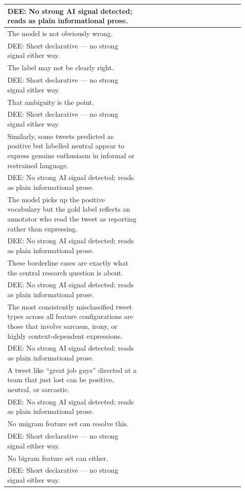 \documentclass[11pt]{article}
\begin{document}
\begin{longtable}{|p{0.55\linewidth}|p{0.40\linewidth}|}
\hline
DEE: No strong AI signal detected; reads as plain informational prose. & \\
\hline
The model is not obviously wrong. & \\[2pt]
\hline
DEE: Short declarative --- no strong signal either way. & \\
\hline
The label may not be clearly right. & \\[2pt]
\hline
DEE: Short declarative --- no strong signal either way. & \\
\hline
That ambiguity is the point. & \\[2pt]
\hline
DEE: Short declarative --- no strong signal either way. & \\
\hline
Similarly, some tweets predicted as positive but labelled neutral appear to express genuine enthusiasm in informal or restrained language. & \\[2pt]
\hline
DEE: No strong AI signal detected; reads as plain informational prose. & \\
\hline
The model picks up the positive vocabulary but the gold label reflects an annotator who read the tweet as reporting rather than expressing. & \\[2pt]
\hline
DEE: No strong AI signal detected; reads as plain informational prose. & \\
\hline
These borderline cases are exactly what the central research question is about. & \\[2pt]
\hline
DEE: No strong AI signal detected; reads as plain informational prose. & \\
\hline
The most consistently misclassified tweet types across all feature configurations are those that involve sarcasm, irony, or highly context-dependent expressions. & \\[2pt]
\hline
DEE: No strong AI signal detected; reads as plain informational prose. & \\
\hline
A tweet like ``great job guys'' directed at a team that just lost can be positive, neutral, or sarcastic. & \\[2pt]
\hline
DEE: No strong AI signal detected; reads as plain informational prose. & \\
\hline
No unigram feature set can resolve this. & \\[2pt]
\hline
DEE: Short declarative --- no strong signal either way. & \\
\hline
No bigram feature set can either. & \\[2pt]
\hline
DEE: Short declarative --- no strong signal either way. & \\

\end{longtable}
\end{document}
